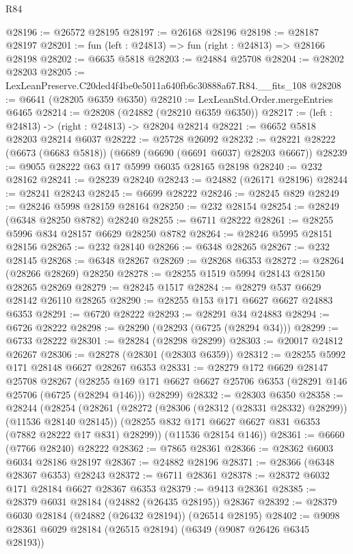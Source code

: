 \begin{lexlean}{R84}
\begin{coremodule}
@28196 := @26572 @28195
@28197 := @26168 @28196
@28198 := @28187 @28197
@28201 := fun (left : @24813) => fun (right : @24813) => @28166 @28198
@28202 := @6635 @5818
@28203 := @24884 @25708
@28204 := @28202 @28203
@28205 := LexLeanPreserve.C20ded4f4be0e5011a640fb6c30888a67.R84.__fits_108
@28208 := @6641 (@28205 @6359 @6350)
@28210 := LexLeanStd.Order.mergeEntries @6465
@28214 := @28208 (@24882 (@28210 @6359 @6350))
@28217 := (left : @24813) -> (right : @24813) -> @28204 @28214
@28221 := @6652 @5818 @28203 @28214 @6037
@28222 := @25728 @26092
@28232 := @28221 @28222 (@6673 (@6683 @5818)) (@6689 (@6690 (@6691 @6037) @28203 @6667))
@28239 := @9055 @28222 @63 @17 @5999 @6035 @28165 @28198
@28240 := @232 @28162
@28241 := @28239 @28240
@28243 := @24882 (@26171 @28196)
@28244 := @28241 @28243
@28245 := @6699 @28222
@28246 := @28245 @829
@28249 := @28246 @5998 @28159 @28164
@28250 := @232 @28154
@28254 := @28249 (@6348 @28250 @8782) @28240
@28255 := @6711 @28222
@28261 := @28255 @5996 @834 @28157 @6629 @28250 @8782
@28264 := @28246 @5995 @28151 @28156
@28265 := @232 @28140
@28266 := @6348 @28265
@28267 := @232 @28145
@28268 := @6348 @28267
@28269 := @28268 @6353
@28272 := @28264 (@28266 @28269) @28250
@28278 := @28255 @1519 @5994 @28143 @28150 @28265 @28269
@28279 := @28245 @1517
@28284 := @28279 @537 @6629 @28142 @26110 @28265
@28290 := @28255 @153 @171 @6627 @6627 @24883 @6353
@28291 := @6720 @28222
@28293 := @28291 @34 @24883
@28294 := @6726 @28222
@28298 := @28290 (@28293 (@6725 (@28294 @34)))
@28299 := @6733 @28222
@28301 := @28284 (@28298 @28299)
@28303 := @20017 @24812 @26267
@28306 := @28278 (@28301 (@28303 @6359))
@28312 := @28255 @5992 @171 @28148 @6627 @28267 @6353
@28331 := @28279
    @172
    @6629
    @28147
    @25708
    @28267
    (@28255 @169 @171 @6627 @6627 @25706 @6353 (@28291 @146 @25706 (@6725 (@28294 @146))) @28299)
@28332 := @28303 @6350
@28358 := @28244
    (@28254
      (@28261
        (@28272 (@28306 (@28312 (@28331 @28332) @28299)) (@11536 @28140 @28145))
        (@28255 @832 @171 @6627 @6627 @831 @6353 (@7882 @28222 @17 @831) @28299))
      (@11536 @28154 @146))
@28361 := @6660 (@7766 @28240) @28222
@28362 := @7865 @28361
@28366 := @28362 @6003 @6034 @28186 @28197
@28367 := @24882 @28196
@28371 := @28366 (@6348 @28367 @6353) @28243
@28372 := @6711 @28361
@28378 := @28372 @6032 @171 @28184 @6627 @28367 @6353
@28379 := @9413 @28361
@28385 := @28379 @6031 @28184 (@24882 (@26435 @28195)) @28367
@28392 := @28379 @6030 @28184 (@24882 (@26432 @28194)) (@26514 @28195)
@28402 := @9098 @28361 @6029 @28184 (@26515 @28194) (@6349 (@9087 @26426 @6345 @28193))

\end{coremodule}
\end{lexlean}
